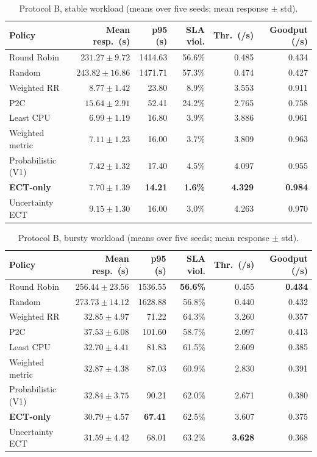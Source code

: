\documentclass[11pt,a4paper]{article}
\begin{document}
\begin{table}[H]
\caption{Protocol B, stable workload (means over five seeds; mean response $\pm$ std).}\label{tab:v2stable}
\centering
\small
\begin{tabular}{lrrrrr}
\toprule
\textbf{Policy} & \textbf{Mean resp.\ (s)} & \textbf{p95 (s)} & \textbf{SLA viol.} & \textbf{Thr.\ (/s)} & \textbf{Goodput (/s)}\\
\midrule
Round Robin        & $231.27 \pm 9.72$  & 1414.63 & 56.6\% & 0.485 & 0.434\\
Random             & $243.82 \pm 16.86$ & 1471.71 & 57.3\% & 0.474 & 0.427\\
Weighted RR        & $8.77 \pm 1.42$    & 23.80   & 8.9\%  & 3.553 & 0.911\\
P2C                & $15.64 \pm 2.91$   & 52.41   & 24.2\% & 2.765 & 0.758\\
Least CPU          & $\mathbf{6.99 \pm 1.19}$ & 16.80 & 3.9\% & 3.886 & 0.961\\
Weighted metric    & $7.11 \pm 1.23$    & 16.00   & 3.7\%  & 3.809 & 0.963\\
Probabilistic (V1) & $7.42 \pm 1.32$    & 17.40   & 4.5\%  & 4.097 & 0.955\\
\textbf{ECT-only}  & $7.70 \pm 1.39$    & \textbf{14.21} & \textbf{1.6\%} & \textbf{4.329} & \textbf{0.984}\\
Uncertainty ECT    & $9.15 \pm 1.30$    & 16.00   & 3.0\%  & 4.263 & 0.970\\
\bottomrule
\end{tabular}
\end{table}

\begin{table}[H]
\caption{Protocol B, bursty workload (means over five seeds; mean response $\pm$ std).}\label{tab:v2bursty}
\centering
\small
\begin{tabular}{lrrrrr}
\toprule
\textbf{Policy} & \textbf{Mean resp.\ (s)} & \textbf{p95 (s)} & \textbf{SLA viol.} & \textbf{Thr.\ (/s)} & \textbf{Goodput (/s)}\\
\midrule
Round Robin        & $256.44 \pm 23.56$ & 1536.55 & \textbf{56.6\%} & 0.455 & \textbf{0.434}\\
Random             & $273.73 \pm 14.12$ & 1628.88 & 56.8\% & 0.440 & 0.432\\
Weighted RR        & $32.85 \pm 4.97$   & 71.22   & 64.3\% & 3.260 & 0.357\\
P2C                & $37.53 \pm 6.08$   & 101.60  & 58.7\% & 2.097 & 0.413\\
Least CPU          & $32.70 \pm 4.41$   & 81.83   & 61.5\% & 2.609 & 0.385\\
Weighted metric    & $32.87 \pm 4.38$   & 87.03   & 60.9\% & 2.830 & 0.391\\
Probabilistic (V1) & $32.84 \pm 3.75$   & 90.21   & 62.0\% & 2.671 & 0.380\\
\textbf{ECT-only}  & $\mathbf{30.79 \pm 4.57}$ & \textbf{67.41} & 62.5\% & 3.607 & 0.375\\
Uncertainty ECT    & $31.59 \pm 4.42$   & 68.01   & 63.2\% & \textbf{3.628} & 0.368\\
\bottomrule
\end{tabular}
\end{table}
\end{document}
